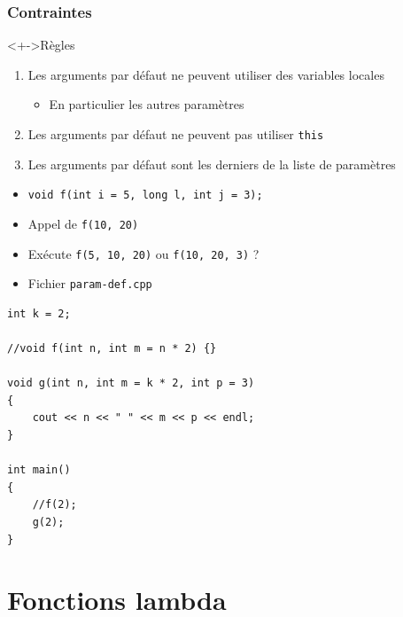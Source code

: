 \begin{frame}
\frametitle{Contraintes}
\begin{alertblock}<+->{Règles}
	\begin{enumerate}[<+->]
	\item Les arguments par défaut ne peuvent utiliser des variables locales
		\begin{itemize}
		\item En particulier les autres paramètres
		\end{itemize}
	\item Les arguments par défaut ne peuvent pas utiliser \lstinline|this|
	\item Les arguments par défaut sont les derniers de la liste de paramètres
	\end{enumerate}
\end{alertblock}
\begin{itemize}[<+->]
\item \lstinline|void f(int i = 5, long l, int j = 3);|
\item Appel de \texttt{f(10, 20)}
\item Exécute \texttt{f(5, 10, 20)} ou \texttt{f(10, 20, 3)} ?
\end{itemize}
\end{frame}

\begin{frame}[containsverbatim]
\begin{itemize}
\item Fichier \texttt{param-def.cpp}
\end{itemize}
\begin{lstlisting}
int k = 2;

//void f(int n, int m = n * 2) {}

void g(int n, int m = k * 2, int p = 3)
{
	cout << n << " " << m << p << endl;
}

int main()
{	
	//f(2);
	g(2);
}
\end{lstlisting}
\end{frame}

\section{Fonctions lambda}

